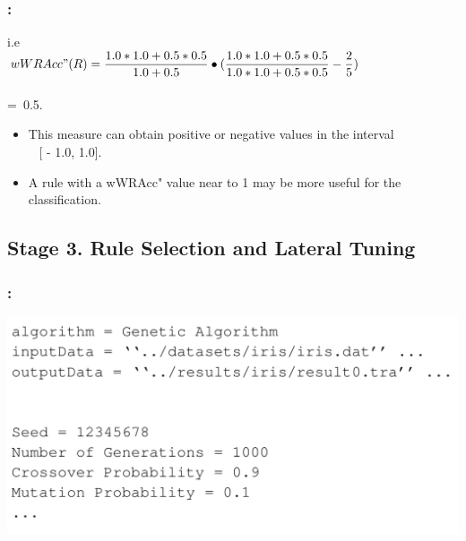 \documentclass{beamer}
\begin{document}
\begin{CJK*}{UTF8}{bsmi}
\begin{frame}
\end{frame}



\begin{frame}
	\frametitle{\insertsection : \insertsubsection}

	\begin{block}{i.e }
	~\\
		\centering\textbf{$wWRAcc"  (R)=\dfrac{1.0\ast1.0+0.5\ast0.5}{1.0+0.5}\bullet(\dfrac{1.0\ast1.0+0.5\ast0.5}{1.0\ast1.0+0.5\ast0.5}-\dfrac{2}{5})$}\\
		~\\
		=~0.5.~~~~~~~~~~~~~~~~~~~~~~~~~~~~~
		~\\
	\end{block}
			\begin{itemize}
				\item This measure can obtain positive or negative values in the interval \\~ [ - 1.0, 1.0]. 
				\item A rule with a wWRAcc" value near to 1 may be more useful for the classification.
			\end{itemize}
	
\end{frame}


\subsection{Stage 3. Rule Selection and Lateral Tuning}

\begin{frame}
	\frametitle{\insertsection : \insertsubsection}

\begin{center}
\includegraphics[height=.6\linewidth]{./4.png}
\end{center}
\end{frame}


\end{CJK*}
\end{document}
